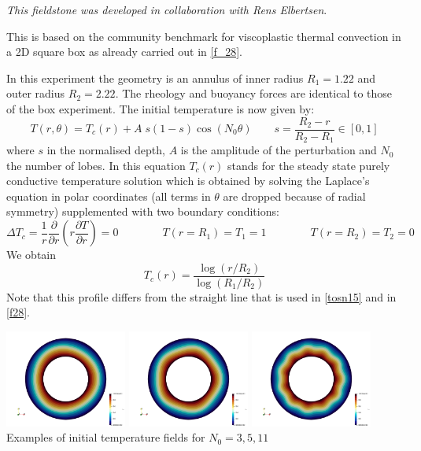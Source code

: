 {\sl This fieldstone was developed in collaboration with Rens Elbertsen}. 

This is based on the community benchmark for viscoplastic thermal convection
in a 2D square box \cite{tosn15} as already carried out in \ref{f_28}.

In this experiment the geometry is an annulus of inner radius 
$R_1=1.22$ and outer radius $R_2=2.22$. 
The rheology and buoyancy forces are identical to those of the box 
experiment. The initial temperature is now given by:
\[
T(r,\theta) = T_c(r)+A\; s(1-s) \cos(N_0 \theta)
\quad\quad s=\frac{R_2-r}{R_2-R_1} \in [0,1]
\]
where $s$ in the normalised depth, $A$ is the amplitude of the perturbation and $N_0$ the 
number of lobes. In this equation $T_c(r)$ stands for the steady state purely conductive 
temperature solution which is obtained by solving the Laplace's equation in 
polar coordinates (all terms in $\theta$ are dropped because of radial symmetry) 
supplemented with two boundary conditions:
\[
\Delta T_c = \frac{1}{r}\frac{\partial }{\partial r} \left( r \frac{\partial T}{\partial r} \right) =0 
\quad\quad
\quad\quad
T(r=R_1)=T_1=1
\quad\quad
\quad\quad
T(r=R_2)=T_2=0
\]
We obtain 
\[
T_c(r)=\frac{\log (r/R_2)}{\log(R_1/R_2)}
\]
Note that this profile differs from the straight line that is used in \ref{tosn15} and in \ref{f28}.

\begin{center}
\includegraphics[width=4cm]{python_codes/fieldstone_33/images/T_N03}
\includegraphics[width=4cm]{python_codes/fieldstone_33/images/T_N05}
\includegraphics[width=4cm]{python_codes/fieldstone_33/images/T_N11}\\
{\small Examples of initial temperature fields for $N_0=3,5,11$}
\end{center}

